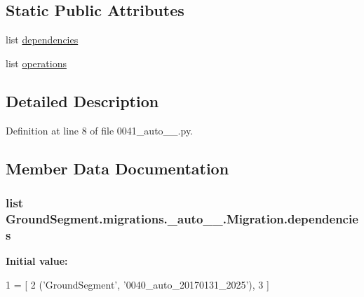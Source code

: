 \subsection*{Static Public Attributes}
\begin{DoxyCompactItemize}
\item 
list \hyperlink{class_ground_segment_1_1migrations_1_10041__auto__20170131__2030_1_1_migration_afc869b3f41d2c1b9946b29bb056e1fdb}{dependencies}
\item 
list \hyperlink{class_ground_segment_1_1migrations_1_10041__auto__20170131__2030_1_1_migration_a31947d154d17d75a49000bba8c36d774}{operations}
\end{DoxyCompactItemize}


\subsection{Detailed Description}


Definition at line 8 of file 0041\+\_\+auto\+\_\+\_.\+py.



\subsection{Member Data Documentation}
\hypertarget{class_ground_segment_1_1migrations_1_10041__auto__20170131__2030_1_1_migration_afc869b3f41d2c1b9946b29bb056e1fdb}{}
\subsubsection[{dependencies}]{\setlength{\rightskip}{0pt plus 5cm}list Ground\+Segment.\+migrations.\+\_\+auto\+\_\+\_.\+Migration.\+dependencies\hspace{0.3cm}{\ttfamily [static]}}\label{class_ground_segment_1_1migrations_1_10041__auto__20170131__2030_1_1_migration_afc869b3f41d2c1b9946b29bb056e1fdb}
{\bfseries Initial value\+:}
\begin{DoxyCode}
1 = [
2         (\textcolor{stringliteral}{'GroundSegment'}, \textcolor{stringliteral}{'0040\_auto\_20170131\_2025'}),
3     ]
\end{DoxyCode}


